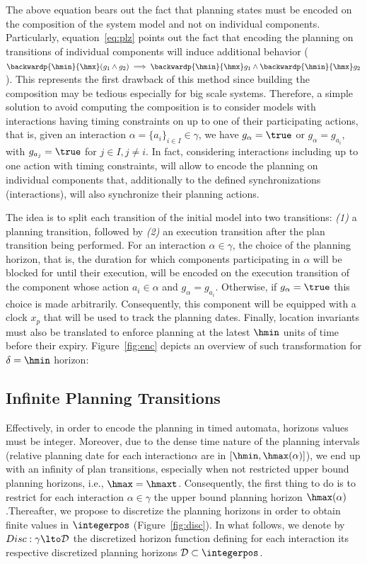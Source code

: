 The above equation bears out the fact that planning states must be encoded on the composition
of the system model and not on individual components. Particularly, equation~\ref{eq:plz}
points out the fact that encoding the planning on transitions of individual components
will induce additional behavior ($\backwardp{\hmin}{\hmx}(g_1\wedge g_2) \implies
\backwardp{\hmin}{\hmx} g_1\wedge\backwardp{\hmin}{\hmx}g_2$). This represents the first 
drawback of
this method since building the composition may be tedious especially for big scale systems.
Therefore, a simple solution to avoid computing the composition is to consider
models with interactions having timing constraints on up to one of their participating
actions, that is, given an interaction $\alpha=\{a_i\}_{i\in I}\in\gamma$, we have
$g_{\alpha}=\true$ or $g_{\alpha}=g_{a_i}$, with $g_{a_j}=\true$ for $j\in I, j\neq i$.
In fact, considering interactions including up to one action with timing constraints, 
will allow to encode the planning on individual components that, additionally to the defined 
synchronizations (interactions), will also synchronize their planning actions. 

The idea is to split each transition of the initial model into two transitions:
\emph{(1)} a planning transition, followed by \emph{(2)} an execution transition
after the plan transition being performed. For an interaction $\alpha\in\gamma$, the choice
of the planning horizon, that is, the duration for which components participating in $\alpha$ 
will be blocked for until their execution, will be encoded on the execution transition of 
the component whose action $a_i\in\alpha$ and $g_{\alpha}=g_{a_i}$. Otherwise,
if $g_{\alpha}=\true$ this choice is made arbitrarily. Consequently, this component will be 
equipped with a clock $x_p$ that will be used to track the planning dates. 
Finally, location invariants must also be translated to enforce planning
at the latest $\hmin$ units of time before their expiry.
Figure~\ref{fig:enc} depicts an overview of such transformation for $\delta=\hmin$ horizon: 


\subsection{Infinite Planning Transitions} 

Effectively, in order to encode the planning in timed automata, horizons values must
be integer. Moreover, due to the dense time nature of the planning intervals (relative 
planning date for each interaction$\alpha$ are in $[\hmin,\hmax(\alpha)]$), we end up with 
an infinity of plan transitions, especially when not restricted upper bound planning horizons, 
i.e., $\hmax=\hmaxt$.
Consequently, the first thing to do is to restrict for each interaction $\alpha\in\gamma$ the
upper bound planning horizon $\hmax(\alpha)$.Thereafter, we propose to discretize the 
planning horizons in order to obtain finite values in $\integerpos$ (Figure~\ref{fig:disc}). 
In what follows, we denote by $Disc:\gamma\lto\mathcal{D}$ the discretized horizon function 
defining for each interaction its respective discretized planning horizons 
$\mathcal{D}\subset\integerpos$.


